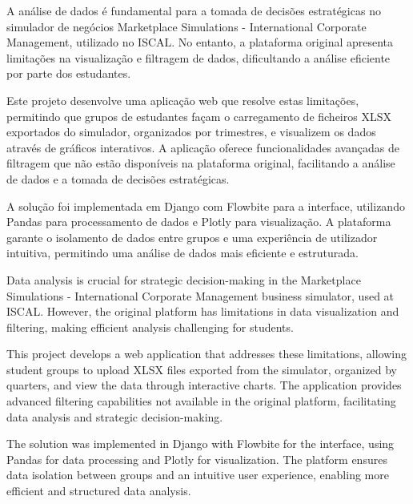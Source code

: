 




A análise de dados é fundamental para a tomada de decisões estratégicas no simulador de negócios Marketplace Simulations - International Corporate Management, utilizado no ISCAL. No entanto, a plataforma original apresenta limitações na visualização e filtragem de dados, dificultando a análise eficiente por parte dos estudantes.

Este projeto desenvolve uma aplicação web que resolve estas limitações, permitindo que grupos de estudantes façam o carregamento de ficheiros XLSX exportados do simulador, organizados por trimestres, e visualizem os dados através de gráficos interativos. A aplicação oferece funcionalidades avançadas de filtragem que não estão disponíveis na plataforma original, facilitando a análise de dados e a tomada de decisões estratégicas.

A solução foi implementada em Django com Flowbite para a interface, utilizando Pandas para processamento de dados e Plotly para visualização. A plataforma garante o isolamento de dados entre grupos e uma experiência de utilizador intuitiva, permitindo uma análise de dados mais eficiente e estruturada.







Data analysis is crucial for strategic decision-making in the Marketplace Simulations - International Corporate Management business simulator, used at ISCAL. However, the original platform has limitations in data visualization and filtering, making efficient analysis challenging for students.

This project develops a web application that addresses these limitations, allowing student groups to upload XLSX files exported from the simulator, organized by quarters, and view the data through interactive charts. The application provides advanced filtering capabilities not available in the original platform, facilitating data analysis and strategic decision-making.

The solution was implemented in Django with Flowbite for the interface, using Pandas for data processing and Plotly for visualization. The platform ensures data isolation between groups and an intuitive user experience, enabling more efficient and structured data analysis.
